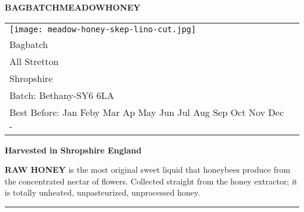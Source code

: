 \documentclass[10pt, a4paper]{letter}
\newcommand{\MONTH}{%
  \ifcase\the\month
  \or Jan%
  \or Feby%
  \or Mar%
  \or Ap%
  \or May%
  \or Jun%
  \or Jul%
  \or Aug%
  \or Sep%
  \or Oct%
  \or Nov%
  \or Dec%
  \fi}
\begin{document}

\newcommand\honeylabel{%
{\fontsize{15pt}{20pt}\selectfont  \textbf{BAGBATCH\hfil MEADOW\hfil HONEY}} 
  \begin{tabular}{ll}%
    \begin{minipage}{2cm}%
      \smallskip
      \texttt{[image: meadow-honey-skep-lino-cut.jpg]}
    \end{minipage}%
    &
    \begin{minipage}{4.5cm}
     \par
      454g 1lb \hfill Joe Collins\\
      \footnotesize\strut\hfill Bagbatch\\
      \strut\hfill All Stretton\\
      \strut\hfill  Shropshire\\
      Batch: Bethany-\the\month \hfill SY6 6LA\\
      \AdvanceDate[730]%
      Best Before: \MONTH-\the\year{} \hfill\strut 
    \end{minipage}
  \end{tabular}
{\fontsize{14pt}{20pt}\selectfont  \textbf{Harvested in Shropshire England}}
}%

\begin{labels}
%
{%
  \honeylabel
  
}%
\end{labels}

\LeftLabelBorder=5mm%
\RightLabelBorder=5mm%
\TopLabelBorder=5mm%
\BottomLabelBorder=5mm%
\LabelSetup%
\newcommand\rawlabel{%
  \small
  {\bf RAW HONEY} is the most original sweet liquid that honeybees produce from the concentrated nectar of flowers. 
   Collected straight from the honey extractor; it is totally unheated, unpasteurized, unprocessed honey.\vfill
}%

\begin{labels}
%
{%
  \rawlabel
  
}%
\end{labels}


\LeftPageMargin=0mm
\LabelSetup
\setlength{\parskip}{1em}
%
{%
  \rule{\paperwidth}{3pt}\par\par
}%
\end{document}

